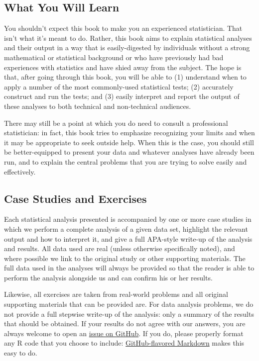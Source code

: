 \begin{preface}
\subsection{What You Will Learn}
You shouldn't expect this book to make you an experienced statistician. That isn't what it's meant to do. Rather, this book aims to explain statistical analyses and their output in a way that is easily-digested by individuals without a strong mathematical or statistical background or who have previously had bad experiences with statistics and have shied away from the subject. The hope is that, after going through this book, you will be able to (1) understand when to apply a number of the most commonly-used statistical tests; (2) accurately construct and run the tests; and (3) easily interpret and report the output of these analyses to both technical and non-technical audiences.

There may still be a point at which you do need to consult a professional statistician: in fact, this book tries to emphasize recognizing your limits and when it may be appropriate to seek outside help. When this is the case, you should still be better-equipped to present your data and whatever analyses have already been run, and to explain the central problems that you are trying to solve easily and effectively.

\subsection{Case Studies and Exercises}
Each statistical analysis presented is accompanied by one or more case studies in which we perform a complete analysis of a given data set, highlight the relevant output and how to interpret it, and give a full APA-style write-up of the analysis and results. All data used are real (unless otherwise specifically noted), and where possible we link to the original study or other supporting materials. The full data used in the analyses will always be provided so that the reader is able to perform the analysis alongside us and can confirm his or her results.

Likewise, all exercises are taken from real-world problems and all original supporting materials that can be provided are. For data analysis problems, we do not provide a full stepwise write-up of the analysis: only a summary of the results that should be obtained. If your results do not agree with our answers, you are always welcome to open an \href{https://github.com/faulconbridge/appliedStats/issues}{issue on GitHub}. If you do, please properly format any R code that you choose to include: \href{https://guides.github.com/features/mastering-markdown/}{GitHub-flavored Markdown} makes this easy to do.


\end{preface}

